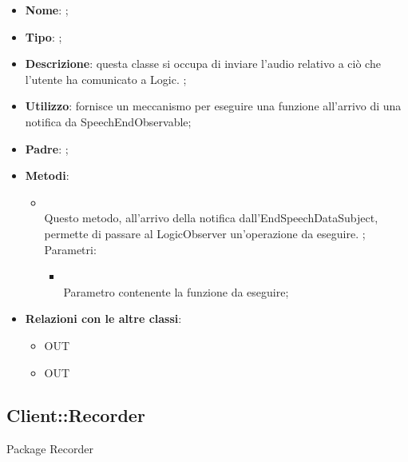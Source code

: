 \begin{itemize}
	\item \textbf{Nome}: ;
	\item \textbf{Tipo}: ;
	\item \textbf{Descrizione}: questa classe si occupa di inviare l'audio relativo a ciò che  l'utente ha comunicato a Logic.
;
	\item \textbf{Utilizzo}: fornisce un meccanismo per eseguire una funzione all'arrivo di una notifica da SpeechEndObservable;
	\item \textbf{Padre}: ;
	\item \textbf{Metodi}:
	\begin{itemize}
		\item[]  \\
		Questo metodo, all'arrivo della notifica dall'EndSpeechDataSubject, permette di passare al LogicObserver un'operazione da eseguire. ;\\
		Parametri:
		\begin{itemize}
			\item {} \\
			Parametro contenente la funzione da eseguire;
		\end{itemize}
	\end{itemize}
	\item \textbf{Relazioni con le altre classi}:
	\begin{itemize}
		\item OUT \hyperlink{SpeechEndObservable_label}{}
		\item OUT \hyperlink{HttpPromise_label}{}
	\end{itemize}
\end{itemize}

\subsection{Client::Recorder}
Package Recorder
